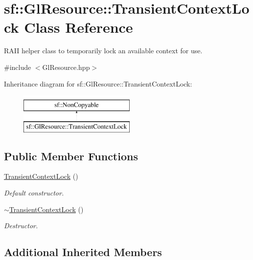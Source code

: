 \hypertarget{classsf_1_1_gl_resource_1_1_transient_context_lock}{}\section{sf\+:\+:Gl\+Resource\+:\+:Transient\+Context\+Lock Class Reference}
\label{classsf_1_1_gl_resource_1_1_transient_context_lock}


R\+A\+II helper class to temporarily lock an available context for use.  




{\ttfamily \#include $<$Gl\+Resource.\+hpp$>$}

Inheritance diagram for sf\+:\+:Gl\+Resource\+:\+:Transient\+Context\+Lock\+:\begin{figure}[H]
\begin{center}
\leavevmode
\includegraphics[height=2.000000cm]{classsf_1_1_gl_resource_1_1_transient_context_lock}
\end{center}
\end{figure}
\subsection*{Public Member Functions}
\begin{DoxyCompactItemize}
\item 
\mbox{\hyperlink{classsf_1_1_gl_resource_1_1_transient_context_lock_a6434ee8f0380c300b361be038f37123a}{Transient\+Context\+Lock}} ()
\begin{DoxyCompactList}\small\item\em Default constructor. \end{DoxyCompactList}\item 
\mbox{\hyperlink{classsf_1_1_gl_resource_1_1_transient_context_lock_a169285281b252ac8d54523b0fcc4b814}{$\sim$\+Transient\+Context\+Lock}} ()
\begin{DoxyCompactList}\small\item\em Destructor. \end{DoxyCompactList}\end{DoxyCompactItemize}
\subsection*{Additional Inherited Members}


